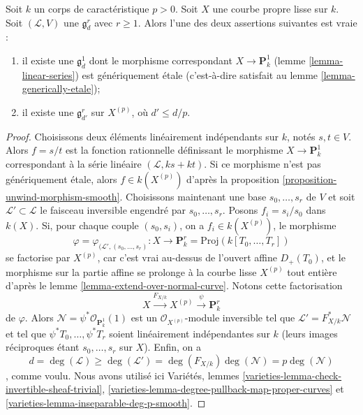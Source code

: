 \begin{lemma}
\label{lemma-inseparable-linear-system}
Soit $k$ un corps de caractéristique $p > 0$. Soit $X$ une courbe propre lisse sur $k$. Soit $(\mathcal{L}, V)$ une $\mathfrak g^r_d$ avec $r \geq 1$. Alors l'une des deux assertions suivantes est vraie : \begin{enumerate} \item il existe une $\mathfrak g^1_d$ dont le morphisme correspondant $X \to \mathbf{P}^1_k$ (lemme \ref{lemma-linear-series}) est génériquement \'etale (c'est-à-dire satisfait au lemme \ref{lemma-generically-etale}); \item il existe une $\mathfrak g^r_{d'}$ sur $X^{(p)}$, où $d' \leq d/p$.
\end{enumerate}
\end{lemma}

\begin{proof}
Choisissons deux éléments linéairement indépendants sur $k$, notés $s, t \in V$. Alors $f = s/t$ est la fonction rationnelle définissant le morphisme $X \to \mathbf{P}^1_k$ correspondant à la série linéaire $(\mathcal{L}, ks + kt)$. Si ce morphisme n'est pas génériquement \'etale, alors $f \in k(X^{(p)})$ d'après la proposition \ref{proposition-unwind-morphism-smooth}. Choisissons maintenant une base $s_0, \ldots, s_r$ de $V$ et soit $\mathcal{L}' \subset \mathcal{L}$ le faisceau inversible engendré par $s_0, \ldots, s_r$. Posons $f_i = s_i/s_0$ dans $k(X)$. Si, pour chaque couple $(s_0, s_i)$, on a $f_i \in k(X^{(p)})$, le morphisme $$
\varphi = \varphi_{(\mathcal{L}', (s_0, \ldots, s_r)} :
X
\longrightarrow
\mathbf{P}^r_k = \text{Proj}(k[T_0, \ldots, T_r])
$$ se factorise par $X^{(p)}$, car c'est vrai au-dessus de l'ouvert affine $D_+(T_0)$, et le morphisme sur la partie affine se prolonge à la courbe lisse $X^{(p)}$ tout entière d'après le lemme \ref{lemma-extend-over-normal-curve}. Notons cette factorisation $$
X \xrightarrow{F_{X/k}} X^{(p)} \xrightarrow{\psi} \mathbf{P}^r_k
$$ de $\varphi$. Alors $\mathcal{N} = \psi^*\mathcal{O}_{\mathbf{P}^1_k}(1)$ est un $\mathcal{O}_{X^{(p)}}$-module inversible tel que $\mathcal{L}' = F_{X/k}^*\mathcal{N}$ et tel que $\psi^*T_0, \ldots, \psi^*T_r$ soient linéairement indépendantes sur $k$ (leurs images réciproques étant $s_0, \ldots, s_r$ sur $X$). Enfin, on a $$
d = \deg(\mathcal{L}) \geq \deg(\mathcal{L}') =
\deg(F_{X/k}) \deg(\mathcal{N}) = p \deg(\mathcal{N})
$$, comme voulu. Nous avons utilisé ici Variétés, lemmes \ref{varieties-lemma-check-invertible-sheaf-trivial}, \ref{varieties-lemma-degree-pullback-map-proper-curves} et \ref{varieties-lemma-inseparable-deg-p-smooth}.
\end{proof}

